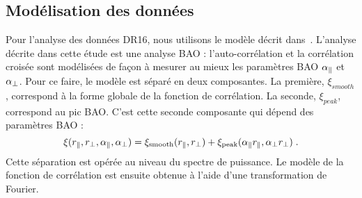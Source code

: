 \documentclass[11pt, twoside, a4paper, openright]{report}
\begin{document}
\subsection{Modélisation des données}
\label{subsec:model_donnees}
Pour l'analyse des données DR16, nous utilisons le modèle décrit dans~\citet{prov}. L'analyse décrite dans cette étude est une analyse BAO : l'auto-corrélation et la corrélation croisée sont modélisées de façon à mesurer au mieux les paramètres BAO $\alpha_{\parallel}{}$ et $\alpha_{\perp}{}$.
Pour ce faire, le modèle est séparé en deux composantes. La première, $\xi_{smooth}$, correspond à la forme globale de la fonction de corrélation. 
La seconde, $\xi_{peak}$, correspond au pic BAO. C'est cette seconde composante qui dépend des paramètres BAO :
\begin{equation}
  \xi(r_{\parallel}{}, r_{\perp}{}, \alpha_{\parallel}{}, \alpha_{\perp}{}) = \xi_{\mathrm{smooth}}(r_{\parallel}{}, r_{\perp}{}) + \xi_{\mathrm{peak}}(\alpha_{\parallel}{} r_{\parallel}{}, \alpha_{\perp}{} r_{\perp}{}) \; .
\end{equation}
Cette séparation est opérée au niveau du spectre de puissance. Le modèle de la fonction de corrélation est ensuite obtenue à l'aide d'une transformation de Fourier.
\end{document}
